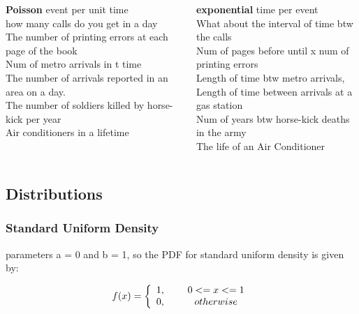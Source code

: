 \documentclass{beamer}
\begin{document}
\begin{frame}%
\begin{columns}
\begin{column}{0.45\textwidth}
\textbf{Poisson}
event per unit time
\\how many calls do you get in a day
\\The number of printing errors at each page of the book
\\Num of metro arrivals in t time
\\The number of arrivals reported in an area on a day.
\\ The number of soldiers killed by horse-kick per year
\\ Air conditioners in a lifetime
\end{column}
\begin{column}{0.45\textwidth}
\textbf{exponential}
time per event
\\What about the interval of time btw the calls
\\Num of pages before until x num of printing errors
\\ Length of time btw metro arrivals,
\\ Length of time between arrivals at a gas station
\\Num of years btw horse-kick deaths in the army
\\ The life of an Air Conditioner

\end{column}

\end{columns}
\end{frame}






\subsection{Distributions}
\begin{frame}\frametitle{Standard Uniform Density}
	parameters a = 0 and b = 1, so the PDF for standard uniform density is given by:
	
	\begin{align}
		f(x) = \left\{ \begin{array}{cc} 
		1, & \hspace{5mm} 0 <= x <=1 \\
		0, & \hspace{5mm} otherwise \\
		\end{array} \right.
	\end{align}
	
\end{frame}
\end{document}
